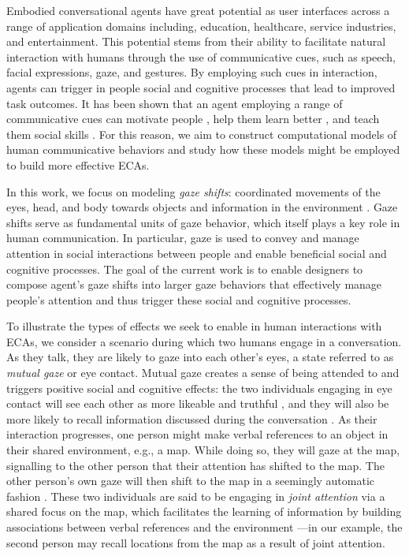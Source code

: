 Embodied conversational agents have great potential as user interfaces across a range of application domains including, education, healthcare, service industries, and entertainment. This potential stems from their ability to facilitate natural interaction with humans through the use of communicative cues, such as speech, facial expressions, gaze, and gestures. By employing such cues in interaction, agents can trigger in people social and cognitive processes that lead to improved task outcomes. It has been shown that an agent employing a range of communicative cues can motivate people \cite{mumm2011motivational}, help them learn better \cite{lusk2007animated}, and teach them social skills \cite{tartaro2007authorable}. For this reason, we aim to construct computational models of human communicative behaviors and study how these models might be employed to build more effective ECAs.

In this work, we focus on modeling \emph{gaze shifts}: coordinated movements of the eyes, head, and body towards objects and information in the environment \cite{zangemeister1982types,mccluskey2007monkeys}. Gaze shifts serve as fundamental units of gaze behavior, which itself plays a key role in human communication. In particular, gaze is used to convey and manage attention in social interactions between people and enable beneficial social and cognitive processes. The goal of the current work is to enable designers to compose agent's gaze shifts into larger gaze behaviors that effectively manage people's attention and thus trigger these social and cognitive processes.

To illustrate the types of effects we seek to enable in human interactions with ECAs, we consider a scenario during which two humans engage in a conversation. As they talk, they are likely to gaze into each other's eyes, a state referred to as \emph{mutual gaze} or eye contact. Mutual gaze creates a sense of being attended to and triggers positive social and cognitive effects: the two individuals engaging in eye contact will see each other as more likeable and truthful \cite{goldberg1969visual,argyle1976gaze}, and they will also be more likely to recall information discussed during the conversation \cite{otteson1980effect,sherwood1987facilitative}. As their interaction progresses, one person might make verbal references to an object in their shared environment, e.g., a map. While doing so, they will gaze at the map, signalling to the other person that their attention has shifted to the map. The other person's own gaze will then shift to the map in a seemingly automatic fashion \cite{frischen2007gaze}. These two individuals are said to be engaging in \emph{joint attention} \cite{dentremont2007early} via a shared focus on the map, which facilitates the learning of information by building associations between verbal references and the environment \cite{woodward2005infants}---in our example, the second person may recall locations from the map as a result of joint attention.

